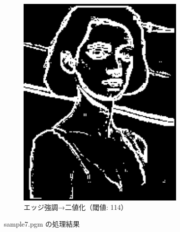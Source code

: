 \documentclass[a4paper,12pt]{jsarticle}
\begin{document}
\begin{figure}[!htbp]
\begin{subfigure}[b]{0.45\textwidth}
    \includegraphics[width=0.9\textwidth]{./images/combined_sample7_combined.png}
    \caption{エッジ強調→二値化（閾値: 114）}
\end{subfigure}
\caption{sample7.pgm の処理結果}
\label{fig:sample7}
\end{figure}
\end{document}
